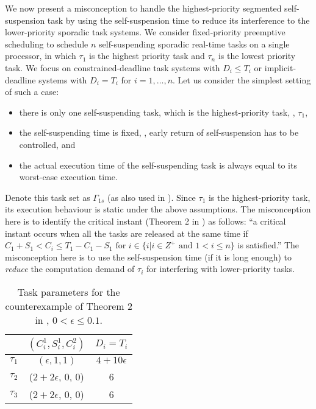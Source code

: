 We now present a misconception to handle the highest-priority segmented self-suspension task by using the self-suspension time to reduce its interference to the lower-priority sporadic task systems. 
We consider fixed-priority preemptive scheduling to schedule $n$ self-suspending sporadic real-time tasks on a single processor, in which $\tau_1$ is the highest priority task and $\tau_n$ is the lowest priority task. We focus on constrained-deadline task systems with $D_i \leq T_i$ or implicit-deadline systems with $D_i=T_i$ for $i=1,\ldots,n$.
Let us consider the simplest setting of such a case:
\begin{itemize}
\item there is only one self-suspending task, which is the highest-priority task, \ie, $\tau_1$,
\item the self-suspending time is fixed, \ie, early return of self-suspension has to be controlled, and
\item the actual execution time of the self-suspending task is always equal to its worst-case execution time.
\end{itemize}
Denote this task set as $\Gamma_{1s}$ (as also used in \cite{RTSS-KimANR13}).  Since $\tau_1$ is the highest-priority task, its execution behaviour is static under the above assumptions. The misconception here is to identify the critical instant  (Theorem 2 in \cite{RTSS-KimANR13}) as follows: ``a critical instant occurs when all the tasks are released at the same time if $C_1 +S_1 < C_i  \leq T_1-C_1-S_1 \mbox{ for } i \in\{i|i\in Z^{+} \mbox{ and } 1<i\leq n\}$ is satisfied.'' The misconception here is to use the self-suspension time (if it is long enough) to \emph{reduce} the computation demand of $\tau_i$ for interfering with lower-priority tasks. 


\begin{table} [t]
\centering
    \begin{tabular}{|c|c|c|}
 \hline
        & $(C_i^1, S_i^1, C_i^2)$ &  $D_i=T_i$\\ 
        \hline
        $\tau_1$ & $(\epsilon, 1, 1)$ &  $4+10\epsilon$\\ 
        $\tau_2$ &  ($2+2\epsilon$, 0, 0) & 6  \\ 
        $\tau_3$ & ($2+2\epsilon$, 0, 0) & 6  \\
        \hline
    \end{tabular} 
    \caption{Task parameters for the counterexample of Theorem 2 in \cite{RTSS-KimANR13}, $0 < \epsilon \leq 0.1$.}
    \label{table:ex-highest-priority}
\end{table}


